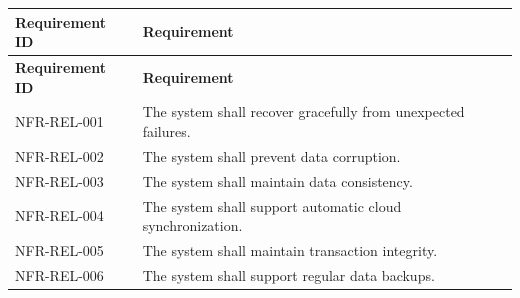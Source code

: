 \begin{longtable}{|p{3cm}|p{10cm}|}

\hline
\textbf{Requirement ID} &
\textbf{Requirement}\\
\hline
\endfirsthead

\hline
\textbf{Requirement ID} &
\textbf{Requirement}\\
\hline
\endhead

NFR-REL-001 &
The system shall recover gracefully from unexpected failures.\\
\hline

NFR-REL-002 &
The system shall prevent data corruption.\\
\hline

NFR-REL-003 &
The system shall maintain data consistency.\\
\hline

NFR-REL-004 &
The system shall support automatic cloud synchronization.\\
\hline

NFR-REL-005 &
The system shall maintain transaction integrity.\\
\hline

NFR-REL-006 &
The system shall support regular data backups.\\
\hline

\end{longtable}

